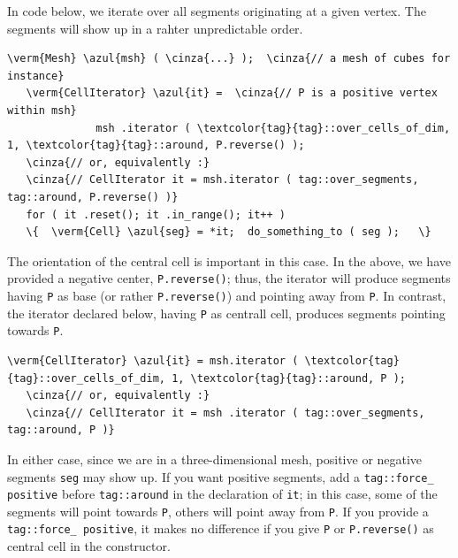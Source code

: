 In code below, we iterate over all segments originating at a given vertex.
The segments will show up in a rahter unpredictable order.

\begin{Verbatim}[commandchars=\\\{\},formatcom=\small\tt,
   baselinestretch=0.94,framesep=2mm                      ]
   \verm{Mesh} \azul{msh} ( \cinza{...} );  \cinza{// a mesh of cubes for instance}
   \verm{CellIterator} \azul{it} =  \cinza{// P is a positive vertex within msh}
              msh .iterator ( \textcolor{tag}{tag}::over_cells_of_dim, 1, \textcolor{tag}{tag}::around, P.reverse() );
   \cinza{// or, equivalently :}
   \cinza{// CellIterator it = msh.iterator ( tag::over_segments, tag::around, P.reverse() )}
   for ( it .reset(); it .in_range(); it++ )
   \{  \verm{Cell} \azul{seg} = *it;  do_something_to ( seg );   \}
\end{Verbatim}

The orientation of the central cell is important in this case.
In the above, we have provided a negative center, {\small\tt P.reverse()};
thus, the iterator will produce segments {\small\tt{}} having {\small\tt P} as base
(or rather {\small\tt P.reverse()}) and pointing away from {\small\tt P}.
In contrast, the iterator declared below, having {\small\tt P} as centrall cell,
produces segments pointing towards {\small\tt P}.

\begin{Verbatim}[commandchars=\\\{\},formatcom=\small\tt,
   baselinestretch=0.94,framesep=2mm                      ]
   \verm{CellIterator} \azul{it} = msh.iterator ( \textcolor{tag}{tag}::over_cells_of_dim, 1, \textcolor{tag}{tag}::around, P );
   \cinza{// or, equivalently :}
   \cinza{// CellIterator it = msh .iterator ( tag::over_segments, tag::around, P )}
\end{Verbatim}

In either case, since we are in a three-dimensional mesh, positive or negative segments
{\small\tt seg} may show up.
If you want positive segments, add a {\small\tt\textcolor{tag}{tag}::force\_\,positive} before
{\small\tt\textcolor{tag}{tag}::around} in the declaration of {\small\tt it};
in this case, some of the segments will point towards {\small\tt P},
others will point away from {\small\tt P}.
If you provide a {\small\tt\textcolor{tag}{tag}::force\_\,positive}, it makes no difference
if you give {\small\tt P} or {\small\tt P.reverse()} as central cell in the constructor.

